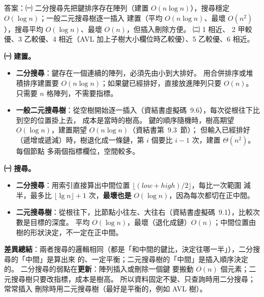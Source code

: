 \begin{pastsoln}
答案：㈠ 二分搜尋先把鍵排序存在陣列（建置 $O(n \log n)$），搜尋穩定 $O(\log n)$；一般二元搜尋樹逐一插入
建置（平均 $O(n \log n)$、最壞 $O(n^2)$），搜尋平均 $O(\log n)$、最壞 $O(n)$，但插入刪除方便。 ㈡ 1 相近、
2 甲較優、3 乙較優、4 相近（AVL 加上子樹大小欄位時乙較優）、5 乙較優、6 相近。

\textbf{㈠ 建置。}
\begin{itemize}
\item \textbf{二分搜尋}：鍵存在一個連續的陣列，必須先由小到大排好。 用合併排序或堆積排序建置要
$O(n \log n)$；如果鍵已經排好，直接放進陣列只要 $O(n)$。 只需要 $n$ 格陣列，不需要指標。
\item \textbf{一般二元搜尋樹}：從空樹開始逐一插入（資結書虛擬碼~9.6），每次從根往下比到空的位置掛上去，
成本是當時的樹高。 鍵的順序隨機時，樹高期望 $O(\log n)$，建置期望 $O(n \log n)$（資結書第~9.3~節）；
但輸入已經排好（遞增或遞減）時，樹退化成一條鏈，第 $i$ 個要比 $i - 1$ 次，建置 $\Theta(n^2)$。 每個節點
多兩個指標欄位，空間較多。
\end{itemize}

\textbf{㈠ 搜尋。}
\begin{itemize}
\item \textbf{二分搜尋}：用索引直接算出中間位置 $\lfloor(\mathit{low} + \mathit{high})/2\rfloor$，每比一次範圍
減半，最多比 $\lfloor \lg n \rfloor + 1$ 次，\textbf{最壞也是} $O(\log n)$，因為每次都切在正中間。
\item \textbf{二元搜尋樹}：從根往下，比節點小往左、大往右（資結書虛擬碼~9.1），比較次數是目標的深度。
平均 $O(\log n)$，最壞（退化成鏈）$O(n)$；中間位置由樹的形狀決定，不一定在正中間。
\end{itemize}
\textbf{差異總結}：兩者搜尋的邏輯相同（都是「和中間的鍵比，決定往哪一半」），二分搜尋的「中間」是算出來
的、一定平衡；二元搜尋樹的「中間」是插入順序決定的。 二分搜尋的弱點在\textbf{更新}：陣列插入或刪除一個鍵
要搬動 $O(n)$ 個元素；二元搜尋樹只要改指標，成本是樹高。 所以資料固定不變、只查詢時用二分搜尋；常常插入
刪除時用二元搜尋樹（最好是平衡的，例如 AVL 樹）。


\end{pastsoln}
